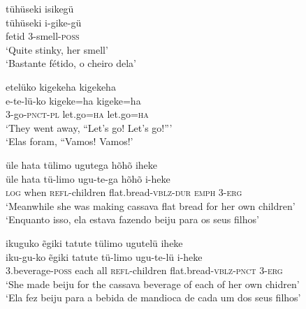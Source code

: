 \documentclass[output=paper,
modfonts,nonflat
]{langsci/langscibook}
\begin{document}
\ea tühüseki isikegü \\[.3em]
\gll tühüseki 	i-gike-gü{\footnotemark}{} \\
fetid 		3-smell-\textsc{poss} \\
\glt ‘Quite stinky, her smell’ \\
‘Bastante fétido, o cheiro dela’ \\
\z

\newpage 
\ea etelüko kigekeha kigekeha \\ [.6em]
\gll e-te-lü-ko 		kigeke=ha	kigeke=ha \\
3-go-\textsc{pnct-pl} 	let.go=\textsc{ha} 	let.go=\textsc{ha} \\
\glt ‘They went away, “Let’s go! Let’s go!”’ \\
‘Elas foram, “Vamos! Vamos!’ \\
\z

\ea üle hata  tülimo ugutega hõhõ iheke \\[.3em]
\gll üle	hata	tü-limo 	ugu-te-ga		hõhõ	i-heke \\
\textsc{log} 	when 	\textsc{refl}-children 	flat.bread{\footnotemark}{}-\textsc{vblz-dur} 	\textsc{emph} 3-\textsc{erg} \\
\glt ‘Meanwhile she was making cassava flat bread for her own children’ \\
‘Enquanto isso, ela estava fazendo beiju para os seus filhos’ \\
\z


\ea ikuguko ẽgiki tatute tülimo ugutelü iheke{\footnotemark}{} \\[.3em]
\gll iku-gu-ko	ẽgiki	tatute	tü-limo			ugu-te-lü		i-heke \\
3.beverage-\textsc{poss}	each 	all 	\textsc{refl}-children 	flat.bread-\textsc{vblz-pnct} 	\textsc{3-erg} \\
\glt ‘She made beiju for the cassava beverage of each of her own chidren’ \\
‘Ela fez beiju para a bebida de mandioca de cada um dos seus filhos’ \\
\z
\end{document}
